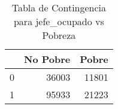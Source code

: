 \begin{table}[ht]
\centering
\begin{tabular}{rrr}
  \toprule
 & No Pobre & Pobre \\ 
  \midrule
0 & 36003 & 11801 \\ 
  1 & 95933 & 21223 \\ 
   \bottomrule
\end{tabular}
\caption{Tabla de Contingencia para jefe_ocupado vs Pobreza} 
\label{tab:contingency_jefe_ocupado}
\end{table}
